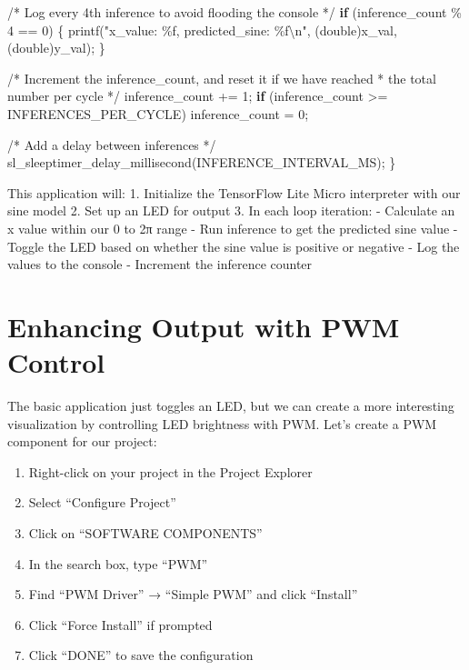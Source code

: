 \documentclass[
  9pt,
  letterpaper,
  abstract,
  titlepage]{scrbook}
\newenvironment{Shaded}{\begin{snugshade}}{\end{snugshade}}
\newcommand{\CommentTok}[1]{\textcolor[rgb]{0.37,0.37,0.37}{#1}}
\newcommand{\ControlFlowTok}[1]{\textcolor[rgb]{0.00,0.23,0.31}{\textbf{#1}}}
\newcommand{\DataTypeTok}[1]{\textcolor[rgb]{0.68,0.00,0.00}{#1}}
\newcommand{\DecValTok}[1]{\textcolor[rgb]{0.68,0.00,0.00}{#1}}
\newcommand{\NormalTok}[1]{\textcolor[rgb]{0.00,0.23,0.31}{#1}}
\newcommand{\OperatorTok}[1]{\textcolor[rgb]{0.37,0.37,0.37}{#1}}
\newcommand{\SpecialCharTok}[1]{\textcolor[rgb]{0.37,0.37,0.37}{#1}}
\newcommand{\StringTok}[1]{\textcolor[rgb]{0.13,0.47,0.30}{#1}}
\providecommand{\tightlist}{%
  \setlength{\itemsep}{0pt}\setlength{\parskip}{0pt}}\usepackage{longtable,booktabs,array}
\def\tightlist{}
\let\tightlist\relax
\begin{document}
\begin{Shaded}
\begin{Highlighting}[]
  \CommentTok{/* Log every 4th inference to avoid flooding the console */}
  \ControlFlowTok{if} \OperatorTok{(}\NormalTok{inference\_count }\OperatorTok{\%} \DecValTok{4} \OperatorTok{==} \DecValTok{0}\OperatorTok{)} \OperatorTok{\{}
\NormalTok{    printf}\OperatorTok{(}\StringTok{"x\_value: }\SpecialCharTok{\%f}\StringTok{, predicted\_sine: }\SpecialCharTok{\%f\textbackslash{}n}\StringTok{"}\OperatorTok{,} \OperatorTok{(}\DataTypeTok{double}\OperatorTok{)}\NormalTok{x\_val}\OperatorTok{,} \OperatorTok{(}\DataTypeTok{double}\OperatorTok{)}\NormalTok{y\_val}\OperatorTok{);}
  \OperatorTok{\}}
  
  \CommentTok{/* Increment the inference\_count, and reset it if we have reached}
\CommentTok{   * the total number per cycle */}
\NormalTok{  inference\_count }\OperatorTok{+=} \DecValTok{1}\OperatorTok{;}
  \ControlFlowTok{if} \OperatorTok{(}\NormalTok{inference\_count }\OperatorTok{\textgreater{}=}\NormalTok{ INFERENCES\_PER\_CYCLE}\OperatorTok{)}\NormalTok{ inference\_count }\OperatorTok{=} \DecValTok{0}\OperatorTok{;}
  
  \CommentTok{/* Add a delay between inferences */}
\NormalTok{  sl\_sleeptimer\_delay\_millisecond}\OperatorTok{(}\NormalTok{INFERENCE\_INTERVAL\_MS}\OperatorTok{);}
\OperatorTok{\}}
\end{Highlighting}
\end{Shaded}

This application will: 1. Initialize the TensorFlow Lite Micro
interpreter with our sine model 2. Set up an LED for output 3. In each
loop iteration: - Calculate an x value within our 0 to 2π range - Run
inference to get the predicted sine value - Toggle the LED based on
whether the sine value is positive or negative - Log the values to the
console - Increment the inference counter

\section{Enhancing Output with PWM
Control}\label{enhancing-output-with-pwm-control}

The basic application just toggles an LED, but we can create a more
interesting visualization by controlling LED brightness with PWM. Let's
create a PWM component for our project:

\begin{enumerate}
\def\labelenumi{\arabic{enumi}.}
\tightlist
\item
  Right-click on your project in the Project Explorer
\item
  Select ``Configure Project''
\item
  Click on ``SOFTWARE COMPONENTS''
\item
  In the search box, type ``PWM''
\item
  Find ``PWM Driver'' → ``Simple PWM'' and click ``Install''
\item
  Click ``Force Install'' if prompted
\item
  Click ``DONE'' to save the configuration
\end{enumerate}
\end{document}
